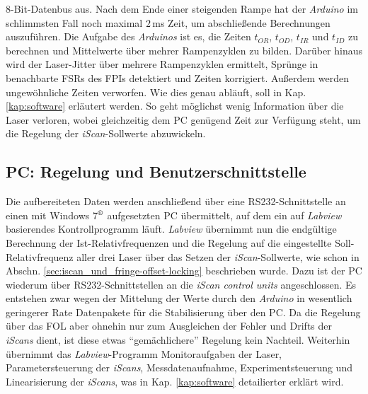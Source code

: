 8-Bit-Datenbus aus. Nach dem Ende einer steigenden Rampe hat der
\textit{Arduino} im schlimmsten Fall noch maximal $2\,$ms Zeit, um abschließende Berechnungen
auszuführen. Die Aufgabe des \textit{Arduinos} ist es, die Zeiten $t_{OR}$,
$t_{OD}$, $t_{IR}$ und $t_{ID}$ zu berechnen und Mittelwerte über mehrer Rampenzyklen zu
bilden. Darüber hinaus wird der Laser-Jitter über mehrere Rampenzyklen
ermittelt, Sprünge in benachbarte FSRs des FPIs detektiert und Zeiten
korrigiert. Außerdem werden ungewöhnliche Zeiten verworfen. Wie dies genau
abläuft, soll in Kap. \ref{kap:software} erläutert werden. So geht möglichst
wenig Information über die Laser verloren, wobei gleichzeitig dem PC genügend
Zeit zur Verfügung steht, um die Regelung der \textit{iScan}-Sollwerte
abzuwickeln.

\subsection{PC: Regelung und
Benutzerschnittstelle}\label{subsec:pc_regelung_benutzerschnittstelle}
Die aufbereiteten Daten werden anschließend über eine RS232-Schnittstelle an einen mit Windows
7$^\text{\textregistered}$ aufgesetzten PC übermittelt, auf dem ein auf
\textit{Labview} basierendes Kontrollprogramm läuft. \textit{Labview} übernimmt nun die endgültige Berechnung der
Ist-Relativfrequenzen und die Regelung auf die eingestellte Soll-Relativfrequenz
aller drei Laser über das Setzen der \textit{iScan}-Sollwerte, wie schon in
Abschn.
\ref{sec:iscan_und_fringe-offset-locking} beschrieben wurde.
Dazu ist der PC wiederum über RS232-Schnittstellen an die \textit{iScan control
units} angeschlossen. Es entstehen zwar wegen der Mittelung der Werte durch den
\textit{Arduino} in wesentlich geringerer Rate Datenpakete für die Stabilisierung über den PC. Da
die Regelung über das FOL aber ohnehin nur zum Ausgleichen der Fehler und Drifts
der \textit{iScans} dient, ist diese etwas "`gemächlichere"' Regelung kein
Nachteil.
Weiterhin übernimmt das \textit{Labview}-Programm Monitoraufgaben der Laser,
Parametersteuerung der \textit{iScans}, Messdatenaufnahme, Experimentsteuerung
und Linearisierung der \textit{iScans}, was in Kap. \ref{kap:software}
detailierter erklärt wird.\par

